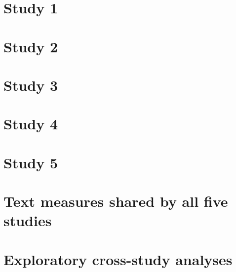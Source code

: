 \documentclass[11pt,a4paper]{article}
\begin{document}
\section{Study 1}


\section{Study 2}


\section{Study 3}


\section{Study 4}


\section{Study 5}


\section{Text measures shared by all five studies}


\section{Exploratory cross-study analyses}




\end{document}
